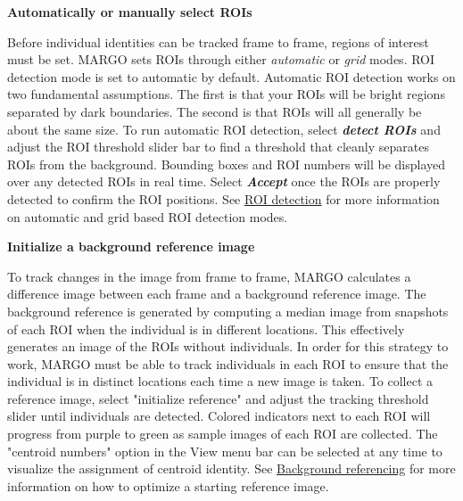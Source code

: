 \documentclass[11pt]{article}
\begin{document}
\begin{figure}[h!]
	\begin{center}
	\end{center}
	\footnotesize {}
\end{figure}

\fontsize{10}{0}
\textbf{Automatically or manually select ROIs} 

Before individual identities can be tracked frame to frame, regions of interest must be set. MARGO sets ROIs through either \textit{automatic} or \textit{grid} modes. ROI detection mode is set to automatic by default. Automatic ROI detection works on two fundamental assumptions. The first is that your ROIs will be bright regions separated by dark boundaries. The second is that ROIs will all generally be about the same size. To run automatic ROI detection, select \textbf{\textit{detect ROIs}} and adjust the ROI threshold slider bar to find a threshold that cleanly separates ROIs from the background. Bounding boxes and ROI numbers will be displayed over any detected ROIs in real time. Select \textbf{\textit{Accept}} once the ROIs are properly detected to confirm the ROI positions. See \hyperlink{roidetect}{ROI detection} for more information on automatic and grid based ROI detection modes.


\fontsize{10}{0}
\textbf{Initialize a background reference image}

To track changes in the image from frame to frame, MARGO calculates a difference image between each frame and a background reference image. The background reference is generated by computing a median image from snapshots of each ROI when the individual is in different locations. This effectively generates an image of the ROIs without individuals. In order for this strategy to work, MARGO must be able to track individuals in each ROI to ensure that the individual is in distinct locations each time a new image is taken. To collect a reference image, select "initialize reference" and adjust the tracking threshold slider until individuals are detected. Colored indicators next to each ROI will progress from purple to green as sample images of each ROI are collected. The "centroid numbers" option in the View menu bar can be selected at any time to visualize the assignment of centroid identity. See \hyperlink{initializeref}{Background referencing} for more information on how to optimize a starting reference image.
\end{document}
